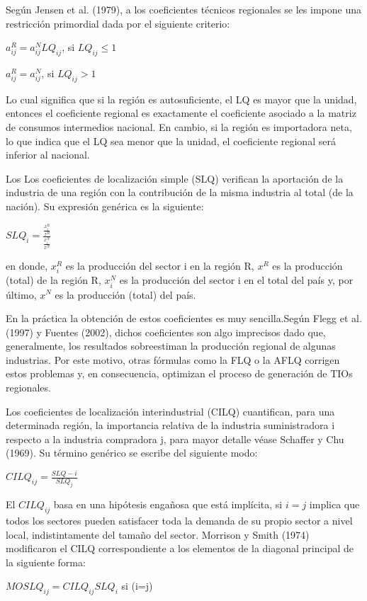 \documentclass{article}
\begin{document}
Según Jensen et al. (1979), a los coeficientes técnicos regionales se les impone una restricción primordial dada por el siguiente criterio:

$a^R_{ij}=a^N_{ij}LQ_{ij}$, si $LQ_{ij} \leq 1$

$a^R_{ij}=a^N_{ij}$, si $LQ_{ij} > 1$

Lo cual significa que si la región es autosuficiente, el LQ es mayor que la unidad, entonces el coeficiente regional es exactamente el coeficiente asociado a la matriz de consumos intermedios nacional. En cambio, si la región es importadora neta, lo que indica que el LQ sea menor que la unidad, el coeficiente regional será inferior al nacional.

Los Los coeficientes de localización simple (SLQ) verifican la aportación de la industria de una región con la contribución de la misma industria al total (de la nación). Su expresión genérica es la siguiente:

$SLQ_i=\frac{\frac{x^R_i}{x^R}}{\frac{x^N_i}{x^N}}$

en donde, $x^R_i$ es la producción del sector i en la región R, $x^R$ es la producción (total) de la región R, $x^N_i$ es la producción del sector i en el total del país y, por último, $x^N$ es la producción (total) del país.


En la práctica la obtención de estos coeficientes es muy sencilla.Según Flegg et al. (1997) y Fuentes (2002), dichos coeficientes son algo imprecisos dado que, generalmente, los resultados sobreestiman la producción regional de algunas industrias. Por este motivo, otras fórmulas como la FLQ o la AFLQ corrigen estos problemas y, en consecuencia, optimizan el proceso de generación de TIOs regionales.

Los coeficientes de localización interindustrial (CILQ) cuantifican, para una determinada región, la importancia relativa de la industria suministradora i respecto a la industria compradora j, para mayor detalle véase Schaffer y Chu (1969). Su término genérico se escribe del siguiente modo:

$CILQ_{ij}=\frac{SLQ-i}{SLQ_j}$


El $CILQ_{ij}$  basa en una hipótesis engañosa que está implícita, si $i = j$ implica que todos los sectores pueden satisfacer toda la demanda de su propio sector a nivel local, indistintamente del tamaño del sector. Morrison y Smith (1974) modificaron el CILQ correspondiente a los elementos de la diagonal principal de la siguiente forma:

$MOSLQ_{ij}=CILQ_{ij}SLQ_i$ si (i=j)
\end{document}
